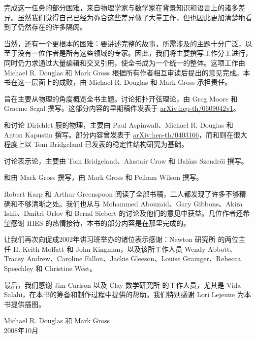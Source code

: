 完成这一任务的部分困难，来自物理学家与数学家在背景知识和语言上的诸多差异。虽然我们觉得自己已经为弥合这些差异做了大量工作，但也因此更加清楚地看到了仍然存在的许多隔阂。

当然，还有一个更根本的困难：要讲述完整的故事，所需涉及的主题十分广泛，以至于没有一位作者是所有这些领域的专家。因此，我们将主要撰写工作分工进行，同时仍力求通过大量编辑和交叉引用，使全书成为一个统一的整体。这项工作由 Michael R. Douglas 和 Mark Gross 根据所有作者相互审读后提出的意见完成。本书在这一层面上的成败，由 Michael R. Douglas 和 Mark Gross 承担责任。

旨在主要从物理的角度概览全书主题。讨论拓扑开弦理论，由 Greg Moore 和 Graeme Segal 撰写。这部分内容的早期稿件发表于 \href{https://arxiv.org/abs/hep-th/0609042v1}{arXiv:hep-th/0609042v1}。

和讨论 Dirichlet 膜的物理，主要由 Paul Aspinwall、Michael R. Douglas 和 Anton Kapustin 撰写。部分内容曾发表于 \href{https://arxiv.org/abs/hep-th/0403166}{arXiv:hep-th/0403166}，而和则在很大程度上以 Tom Bridgeland 已发表的稳定性结构研究为基础。

讨论表示论，主要由 Tom Bridgeland、Alastair Craw 和 Balázs Szendrői 撰写。

和由 Mark Gross 撰写，由 Mark Gross 和 Pelham Wilson 撰写。

Robert Karp 和 Arthur Greenspoon 阅读了全部书稿，二人都发现了许多不够精确和不够清晰之处。我们也从与 Mohammed Abouzaid、Gary Gibbons、Akira Ishii、Dmitri Orlov 和 Bernd Siebert 的讨论及他们的意见中获益。几位作者还希望感谢 IHES 的热情接待，本书的部分内容是在那里完成的。

让我们再次向促成2002年讲习班举办的诸位表示感谢：Newton 研究所 的两位主任 H. Keith Moffatt 和 John Kingman，以及该所工作人员 Wendy Abbott、Tracey Andrew、Caroline Fallon、Jackie Gleeson、Louise Grainger、Rebecca Speechley 和 Christine West。

最后，我们感谢 Jim Carlson 以及 Clay 数学研究所 的工作人员，尤其是 Vida Salahi，在本书的筹备和制作过程中提供的帮助。我们特别感谢 Lori Lejeune 为本书提供插图。

\begin{flushright}
Michael R. Douglas 和 Mark Gross\\
2008年10月
\end{flushright}
